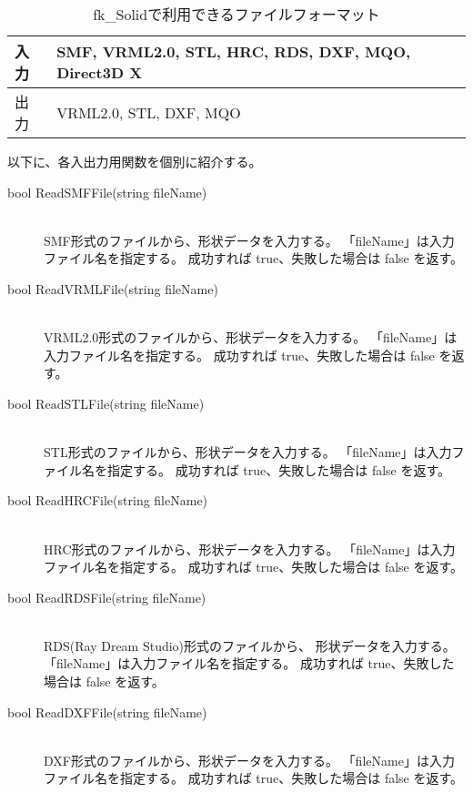 \begin{table}[H]
\caption{fk\_Solidで利用できるファイルフォーマット}
\label{tbl:SolidFileIO}
\begin{center}
\begin{tabular}{|l|l|}
\hline
入力 & SMF, VRML2.0, STL, HRC, RDS, DXF, MQO, Direct3D X \\ \hline
出力 & VRML2.0, STL, DXF, MQO \\ \hline
\end{tabular}
\end{center}
\end{table}
以下に、各入出力用関数を個別に紹介する。
\begin{description}
\item[bool ReadSMFFile(string fileName)] ~ \\
	SMF形式のファイルから、形状データを入力する。
	「fileName」は入力ファイル名を指定する。
	成功すれば true、失敗した場合は false を返す。\\

\item[bool ReadVRMLFile(string fileName)] ~ \\
	VRML2.0形式のファイルから、形状データを入力する。
	「fileName」は入力ファイル名を指定する。
	成功すれば true、失敗した場合は false を返す。\\

\item[bool ReadSTLFile(string fileName)] ~ \\
	STL形式のファイルから、形状データを入力する。
	「fileName」は入力ファイル名を指定する。
	成功すれば true、失敗した場合は false を返す。\\

\item[bool ReadHRCFile(string fileName)] ~ \\
	HRC形式のファイルから、形状データを入力する。
	「fileName」は入力ファイル名を指定する。
	成功すれば true、失敗した場合は false を返す。\\

\item[bool ReadRDSFile(string fileName)] ~ \\
	RDS(Ray Dream Studio)形式のファイルから、
	形状データを入力する。
	「fileName」は入力ファイル名を指定する。
	成功すれば true、失敗した場合は false を返す。\\

\item[bool ReadDXFFile(string fileName)] ~ \\
	DXF形式のファイルから、形状データを入力する。
	「fileName」は入力ファイル名を指定する。
	成功すれば true、失敗した場合は false を返す。\\


\end{description}
